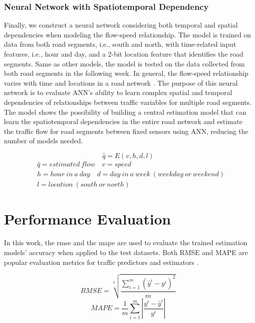 \documentclass[english]{kththesis}
\begin{document}
\subsubsection{Neural Network with Spatiotemporal Dependency}
\label{subsubsec:spatiotemporalNeuralNetwork}
Finally, we construct a neural network considering both temporal and spatial dependencies when modeling the flow-speed relationship. The model is trained on data from both road segments, i.e., south and north, with time-related input features, i.e., hour and day, and a 2-bit location feature that identifies the road segments. Same as other models, the model is tested on the data collected from both road segments in the following week.
In general, the flow-speed relationship varies with time and locations in a road network \cite{blandin_individual_speed}. The purpose of this neural network is to evaluate ANN's ability to learn complex spatial and temporal dependencies of relationships between traffic variables for multiple road segments. The model shows the possibility of building a central estimation model that can learn the spatiotemporal dependencies in the entire road network and estimate the traffic flow for road segments between fixed sensors using ANN, reducing the number of models needed.

\begin{equation}
    \hat{q} = E(v,h,d,l)  
    \label{eq:spatiotemporal_ann_spd}
\end{equation}
\begin{align*}
    & \hat{q} = estimated \ flow \quad v=speed \quad\\
    & h=hour \ in \ a \ day \quad d=day \ in \ a \ week \ (weekday \ or \ weekend)\\
    & l=location \ (south \ or \ north)
\end{align*}

\section{Performance Evaluation}
\label{sec:performanceEvaluation}

In this work, the \acrfull{rmse} and the \acrfull{mape} are used to evaluate the trained estimation models' accuracy when applied to the test datasets. Both RMSE and MAPE are popular evaluation metrics for traffic predictors and estimators \cite{anuar_flow_probe, Bulteau_flow_higher-order, wilby_flow_estimation_xfcd}.

\begin{equation}
    RMSE = \sqrt[2]{\frac{\sum_{i=1}^{m}(\hat{y}^i - y^i)^{2}}{m}}
    \label{eq:rmse}
\end{equation}
\begin{equation}
    MAPE = \frac{1}{m}\sum_{i=1}^{m}\left | \frac{y^i - \hat{y}^i}{y^i} \right |
    \label{eq:mape}
\end{equation}
\end{document}
